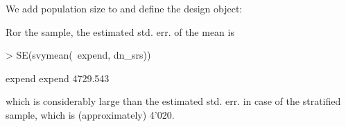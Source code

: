 \begin{Problem}
\begin{Solution}
\begin{Remark}
        We add population size to  and define the design
        object:

\begin{Schunk}
\end{Schunk}

        Ror the \SRS sample, the estimated std. err. of the mean is

\begin{Schunk}
\begin{Sinput}
> SE(svymean(~expend, dn_srs))
\end{Sinput}
\begin{Soutput}
         expend
expend 4729.543
\end{Soutput}
\end{Schunk}

        which is considerably large than the estimated std. err. in case of the
        stratified sample, which is (approximately)
        4'020.

        \vspace{0.5em}


    \end{Remark}
\end{Solution}
\end{Problem}
